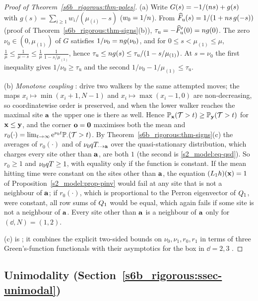 \begin{proof}[Proof of Theorem~\ref{s6b_rigorous:thm-poles}]
(a) Write $G(s)=-1/(n s)+g(s)$ with $g(s)=\sum_{i\ge1}w_i/(\mu_{(i)}-s)$ ($w_0=1/n$). From
$\widehat{F}_{\mathrm u}(s)=1/(1+n s\,g(-s))$ (proof of Theorem~\ref{s6b_rigorous:thm-signs}(b)),
$\tau_{\mathrm u}=-\widehat{F}_{\mathrm u}'(0)=n g(0)$. The zero $\nu_0\in(0,\mu_{(1)})$ of $G$ satisfies
$1/\nu_0=n g(\nu_0)$, and for $0\le s<\mu_{(1)}\le\mu$,
$\frac1\mu\le\frac1{\mu-s}\le\frac1\mu\,\frac1{1-s/\mu_{(1)}}$, hence
$\tau_{\mathrm u}\le n g(s)\le\tau_{\mathrm u}/(1-s/\mu_{(1)})$. At $s=\nu_0$ the first inequality gives
$1/\nu_0\ge\tau_{\mathrm u}$ and the second $1/\nu_0-1/\mu_{(1)}\le\tau_{\mathrm u}$.

(b) \emph{Monotone coupling} : drive two walkers by the same attempted moves; the maps
$x_i\mapsto\min(x_i+1,N-1)$ and $x_i\mapsto\max(x_i-1,0)$ are non-decreasing, so coordinatewise order is preserved,
and when the lower walker reaches the maximal site $\mathbf{a}$ the upper one is there as well. Hence
$\mathbb{P}_{\mathbf{x}}(\mathcal{T}>t)\ge\mathbb{P}_{\mathbf{y}}(\mathcal{T}>t)$ for $\mathbf{x}\le\mathbf{y}$, and the corner $\mathbf{o}=\mathbf0$ maximises both the mean and
$r_0(\cdot)=\lim_{t\to\infty}\mathrm{e}^{\nu_0t}\mathbb{P}_{\cdot}(\mathcal{T}>t)$. By Theorem~\ref{s6b_rigorous:thm-signs}(c) the
averages of $r_0(\cdot)$ and of $\nu_0qT_{\cdot\to\mathbf{a}}$ over the quasi-stationary distribution, which charges every
site other than $\mathbf{a}$, are both $1$ (the second is \eqref{s2_model:eq-qsd}). So $r_0\ge1$ and $\nu_0qT\ge1$, with
equality only if the function is constant. If the mean hitting time were constant on the sites other than $\mathbf{a}$, the
equation $(L_1h)(\mathbf{x})=1$ of Proposition~\ref{s2_model:prop-pinv} would fail at any site that is not a neighbour of
$\mathbf{a}$; if $r_0(\cdot)$, which is proportional to the Perron eigenvector of $Q_1$, were constant, all row sums of
$Q_1$ would be equal, which again fails if some site is not a neighbour of $\mathbf{a}$. Every site other than $\mathbf{a}$ is a
neighbour of $\mathbf{a}$ only for $(\dd,N)=(1,2)$.

(c) is ; it combines the explicit two-sided bounds on $\nu_0,\nu_1,r_0,r_1$ in terms of three
Green's-function functionals  with their asymptotics for the box in $\dd=2,3$
.
\end{proof}

\subsection{Unimodality (Section~\ref{s6b_rigorous:ssec-unimodal})}

